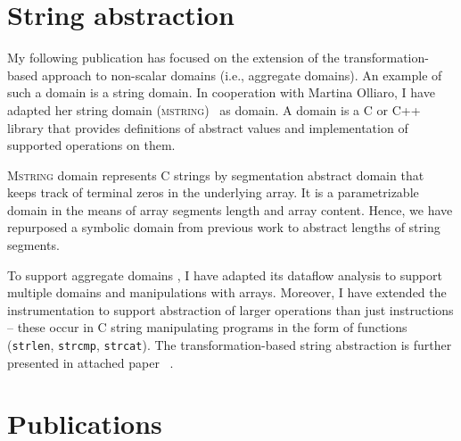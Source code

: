 \section{String abstraction}
\label{sec:string}

My following publication has focused on the extension of the
trans\-for\-ma\-tion-based approach to non-scalar domains (i.e., aggregate
domains).  An example of such a domain is a string domain. In cooperation with
Martina Olliaro, I have adapted her string domain
(\textsc{mstring})~\cite{Olliaro2018} as \lart domain. A \lart domain is a C or
C++ library that provides definitions of abstract values and implementation of
supported operations on them.

\textsc{Mstring} domain represents C strings by segmentation abstract domain
that keeps track of terminal zeros in the underlying array. It is a
parametrizable domain in the means of array segments length and array
content.  Hence, we have repurposed a symbolic domain from previous work to
abstract lengths of string segments.

To support aggregate domains \lart, I have adapted its data\-flow analysis to
support multiple domains and manipulations with \llvm arrays. Moreover, I have
extended the instrumentation to support abstraction of larger operations than
just \llvm instructions -- these occur in C string manipulating programs in the
form of functions (\texttt{strlen}, \texttt{strcmp}, \texttt{strcat}). The
transformation-based string abstraction is further presented in attached paper
~\cite{Lauko2019String}.

\section{Publications}
\label{sec:publications}

